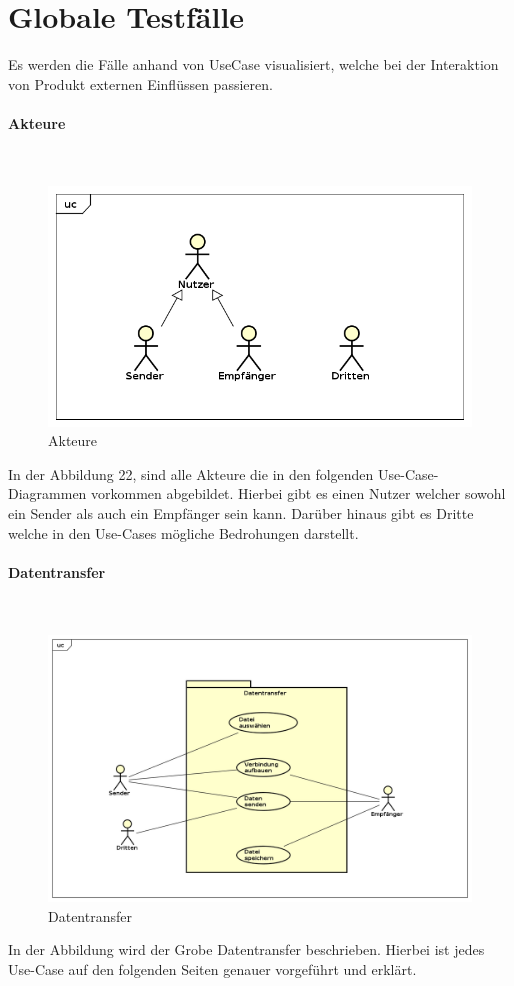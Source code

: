 \section{Globale Testfälle}
Es werden die Fälle anhand von UseCase visualisiert, welche bei der Interaktion von Produkt externen Einflüssen passieren.
\\
\paragraph{Akteure}\mbox{}\\
\begin{figure}[H]
	\centering
	\includegraphics[width= 0.9\linewidth]{diagramms/useCase/akteure.png}
	\caption{Akteure}
\end{figure}
In der Abbildung 22, sind alle Akteure die in den folgenden Use-Case-Diagrammen vorkommen abgebildet. Hierbei gibt es einen Nutzer welcher sowohl ein Sender als auch ein Empfänger sein kann. Darüber hinaus gibt es Dritte welche in den Use-Cases mögliche Bedrohungen darstellt.
\newpage
\paragraph{Datentransfer}\mbox{}\\
\begin{figure}[H]
	\centering
	\includegraphics[width= 0.9\linewidth]{diagramms/useCase/datentransfer.png}
	\caption{Datentransfer}
\end{figure}
In der Abbildung wird der Grobe Datentransfer beschrieben. Hierbei ist jedes Use-Case auf den folgenden Seiten genauer vorgeführt und erklärt.
\newpage
